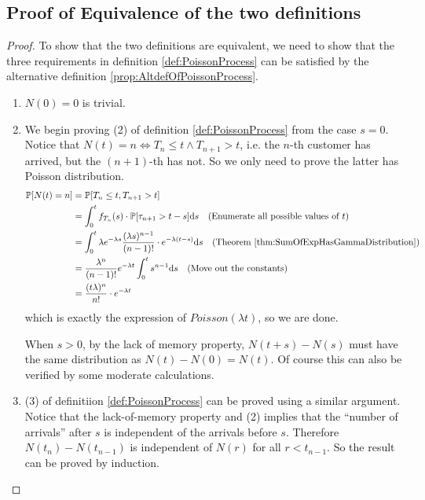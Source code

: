     \subsection{Proof of Equivalence of the two definitions}
        \begin{proof}
            To show that the two definitions are equivalent, we need to show that the three requirements in definition \ref{def:PoissonProcess} can be satisfied by the alternative definition \ref{prop:AltdefOfPoissonProcess}.
            \begin{enumerate}
                \item $N(0)=0$ is trivial.
                \item We begin proving (2) of definition \ref{def:PoissonProcess} from the case $s=0$. Notice that $N(t)=n \Leftrightarrow T_n \le t \wedge T_{n+1} > t$, i.e. the $n$-th customer has arrived, but the $(n+1)$-th has not. So we only need to prove the latter has Poisson distribution.
                \begin{align*}
                    \mathbb{P}[N(t)=n] &= \mathbb{P}[T_n \le t, T_{n+1} > t]\\
                    &= \int_0^tf_{T_n}(s)\cdot\mathbb{P}[\tau_{n+1} > t-s]\mathrm{d}s \quad \text{(Enumerate all possible values of $t$)}\\
                    &= \int_0^t\lambda e^{-\lambda s}\frac{(\lambda s)^{n-1}}{(n-1)!}\cdot e^{-\lambda(t-s)}\mathrm{d}s \quad \text{(Theorem \ref{thm:SumOfExpHasGammaDistribution})}\\
                    &= \frac{\lambda^n}{(n-1)!}e^{-\lambda t}\int_0^t s^{n-1}\mathrm{d}s \quad \text{(Move out the constants)}\\
                    &= \frac{(t\lambda)^n}{n!}\cdot e^{-\lambda t}
                \end{align*}
                which is exactly the expression of $Poisson(\lambda t)$, so we are done.

                When $s > 0$, by the lack of memory property, $N(t+s)-N(s)$ must have the same distribution as $N(t) - N(0) = N(t)$. Of course this can also be verified by some moderate calculations.
                \item (3) of definitiion \ref{def:PoissonProcess} can be proved using a similar argument. Notice that the lack-of-memory property and (2) implies that the ``number of arrivals'' after $s$ is independent of the arrivals before $s$. Therefore $N(t_n) - N(t_{n-1})$ is independent of $N(r)$ for all $r < t_{n-1}$. So the result can be proved by induction.
            \end{enumerate}
        \end{proof}


